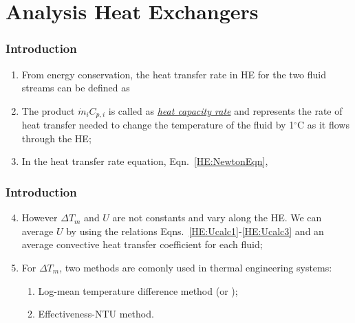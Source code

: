 \documentclass[10pt,compress,handout,ignorenonframetext,unknownkeysallowed]{beamer}
\begin{document}

\section{Analysis Heat Exchangers}

\begin{frame}
  \frametitle{Introduction}
     \begin{enumerate}%
          \item<1-> From energy conservation, the heat transfer rate in HE for the two fluid streams can be defined as
          \item<2-> The product $\dot{m}_{i}C_{p,i}$ is called as \underline{\it heat capacity rate} and represents the rate of heat transfer needed to change the temperature of the fluid by 1$^{\circ}$C as it flows through the HE;
          \item<2-> In the heat transfer rate equation, Eqn.~\ref{HE:NewtonEqn},
     \end{enumerate}

\end{frame}

\begin{frame}
  \frametitle{Introduction}
     \begin{enumerate}\setcounter{enumi}{3}
          \item<1-> However $\Delta T_{m}$ and $U$ are not constants and vary along the HE. We can average $U$ by using the relations Eqns.~\ref{HE:Ucalc1}-\ref{HE:Ucalc3} and an average convective heat transfer coefficient for each fluid;
          \item<2-> For $\Delta T_{m}$, two methods are comonly used in thermal engineering systems:
             \begin{enumerate}
                \item<2-> Log-mean temperature difference method (or );
                \item<2-> Effectiveness-NTU method.
             \end{enumerate}
     \end{enumerate}

\end{frame}
\end{document}
